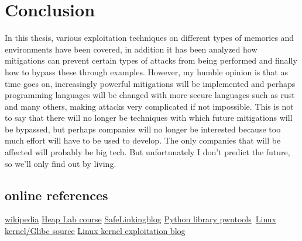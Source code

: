 \chapter{Conclusion}
    In this thesis, various exploitation techniques on different types of memories and environments have been covered, in addition it has been analyzed how mitigations can prevent certain types of attacks from being performed and finally how to bypass these through examples.\newline
    However, my humble opinion is that as time goes on, increasingly powerful mitigations will be implemented and perhaps programming languages will be changed with more secure languages such as rust and many others, making attacks very complicated if not impossible.\newline
    This is not to say that there will no longer be techniques with which future mitigations will be bypassed, but perhaps companies will no longer be interested because too much effort will have to be used to develop.\newline
    The only companies that will be affected will probably be big tech.\newline
    But unfortunately I don't predict the future, so we'll only find out by living.\newline
    \section{online references}
    \href{https://it.wikipedia.org/wiki/Home_page}{wikipedia}\newline
    \href{https://it.wikipedia.org/wiki/Home_page}{Heap Lab course}\newline
    \href{https://www.researchinnovations.com/post/bypassing-the-upcoming-safe-linking-mitigation}{SafeLinkingblog}\newline 
    \href{https://docs.pwntools.com/en/stable/}{Python library pwntools}\newline\
    \href{https://elixir.bootlin.com/}{Linux kernel/Glibc source}\newline
    \href{https://lkmidas.github.io/posts/20210123-linux-kernel-pwn-part-1/}{Linux kernel exploitation blog}